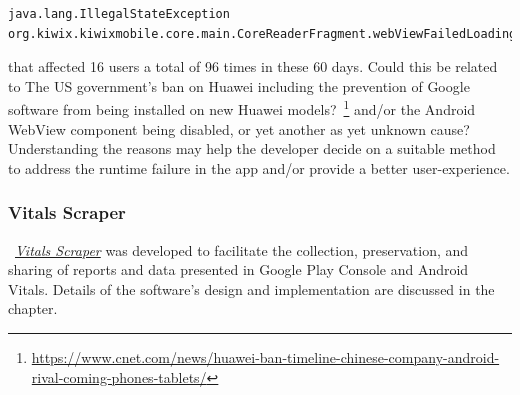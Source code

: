 \begin{lstlisting}
java.lang.IllegalStateException
org.kiwix.kiwixmobile.core.main.CoreReaderFragment.webViewFailedLoading
\end{lstlisting}

that affected 16 users a total of 96 times in these 60 days. %
Could this be related to The US government's ban on Huawei including the prevention of Google software from being installed on new Huawei models?~\footnote{\url{https://www.cnet.com/news/huawei-ban-timeline-chinese-company-android-rival-coming-phones-tablets/}} and/or the Android WebView component being disabled, or yet another as yet unknown cause? Understanding the reasons may help the developer decide on a suitable method to address the runtime failure in the app and/or provide a better user-experience.




\subsubsection{Vitals Scraper}
~\href{section-vitals-scraper}{\emph{Vitals Scraper}} was developed to facilitate the collection, preservation, and sharing of reports and data presented in Google Play Console and Android Vitals. Details of the software's design and implementation are discussed in the~\href{chapter-code-needed}{} chapter.

